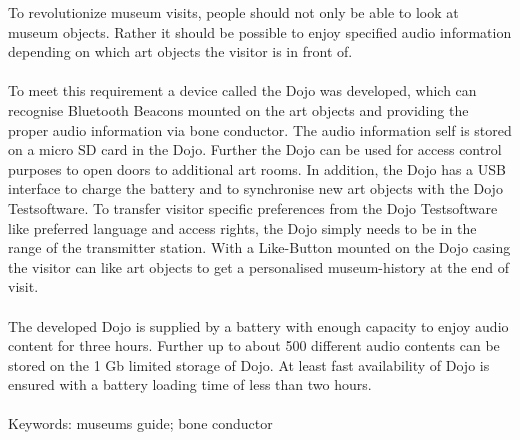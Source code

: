 To revolutionize museum visits, people should not only be able to look at museum objects. Rather it should be possible to enjoy specified audio information depending on which art objects the visitor is in front of.\\\\ To meet this requirement a device called the Dojo was developed, which can recognise Bluetooth Beacons mounted on the art objects and providing the proper audio information via bone conductor. The audio information self is stored on a micro SD card in the Dojo. Further the Dojo can be used for access control purposes to open doors to additional art rooms. In addition, the Dojo has a USB interface to charge the battery and to synchronise new art objects with the Dojo Testsoftware. To transfer visitor specific preferences from the Dojo Testsoftware like preferred language and access rights, the Dojo simply needs to be in the range of the transmitter station. With a Like-Button mounted on the Dojo casing the visitor can like art objects to get a personalised museum-history at the end of visit.\\\\ The developed Dojo is supplied by a battery with enough capacity to enjoy audio content for three hours. Further up to about 500 different audio contents can be stored on the 1 Gb limited storage of Dojo. At least fast availability of Dojo is ensured with a battery loading time of less than two hours.\\\\ Keywords: museums guide; bone conductor

